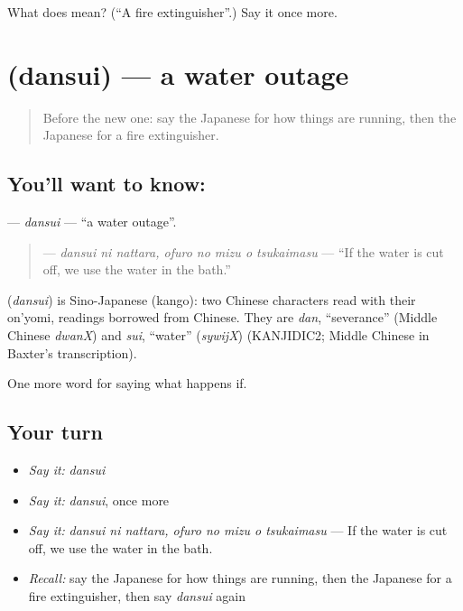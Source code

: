 \begin{tcolorbox}[breakable,colback=teal!4,colframe=teal!35!black,title={Before you move on}]
What does  mean? (\textquotedblleft{}A fire extinguisher\textquotedblright{}.) Say it once more.
\end{tcolorbox}
\section[\texorpdfstring{\ja{だんすい} (dansui)}{だんすい (dansui)}]{ (dansui) — a water outage}

\label{lesson:JA-C353-dansui}



\begin{quote}
Before the new one: say the Japanese for how things are running, then the Japanese for a fire extinguisher.
\end{quote}

\subsection*{You'll want to know: }
\textbf{} — \emph{dansui} — \textquotedblleft{}a water outage\textquotedblright{}.

\begin{quote}
\textbf{   } — \emph{dansui ni nattara, ofuro no mizu o tsukaimasu} — \textquotedblleft{}If the water is cut off, we use the water in the bath.\textquotedblright{}
\end{quote}

\begin{cousinweb}
\textbf{} (\emph{dansui}) is Sino-Japanese (kango): two Chinese characters read with their on'yomi, readings borrowed from Chinese. They are \emph{dan}, \textquotedblleft{}severance\textquotedblright{} (Middle Chinese \emph{dwanX}) and \emph{sui}, \textquotedblleft{}water\textquotedblright{} (\emph{sywijX}) (KANJIDIC2; Middle Chinese in Baxter's transcription).
\end{cousinweb}

\begin{grammarlens}[title={What you've built}]
One more word for saying what happens if.
\end{grammarlens}

\subsection*{Your turn}
\begin{itemize}
\raggedright
  \item \emph{Say it:} \emph{dansui}
  \item \emph{Say it:} \emph{dansui}, once more
  \item \emph{Say it:} \emph{dansui ni nattara, ofuro no mizu o tsukaimasu} — If the water is cut off, we use the water in the bath.
  \item \emph{Recall:} say the Japanese for how things are running, then the Japanese for a fire extinguisher, then say \emph{dansui} again
\end{itemize}

